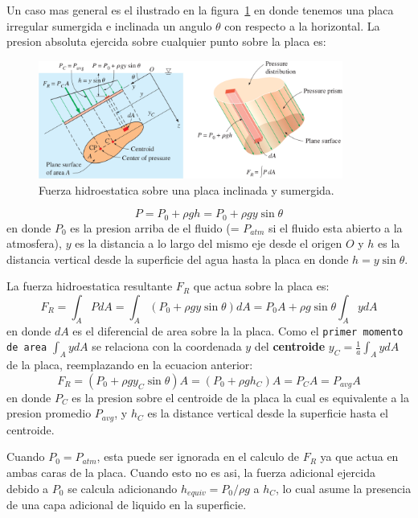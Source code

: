 \documentclass[10pt, oneside]{article}
\begin{document}
Un caso mas general es el ilustrado en la figura~\ref{hes2} en donde tenemos una placa irregular sumergida e inclinada un angulo $\theta$ con respecto a la horizontal. La presion absoluta ejercida sobre cualquier punto sobre la placa es:
\begin{figure}[h]
\centering
\includegraphics[width=10cm]{hes2}
\caption{Fuerza hidroestatica sobre una placa inclinada y sumergida.}
\label{hes2}
\end{figure}

$$
P=P_0 + \rho g h = P_0 + \rho g y \sin \theta
$$
en donde $P_0$ es la presion arriba de el fluido (= $P_{atm}$ si el fluido esta abierto a la atmosfera), $y$ es la distancia a lo largo del mismo eje desde el origen $O$ y $h$ es la distancia vertical desde la superficie del agua hasta la placa en donde $h=y \sin \theta$. 

La fuerza hidroestatica resultante $F_R$ que actua sobre la placa es:
$$
F_R = \int_A P dA = \int_A (P_0 + \rho g y \sin \theta) dA = P_0 A + \rho g \sin \theta \int_A y dA
$$
en donde $dA$ es el diferencial de area sobre la la placa. Como el \texttt{primer momento de area} $\int_A y dA$ se relaciona con la coordenada $y$ del \textbf{centroide} $y_C = \frac{1}{a} \int_A y dA$ de la placa, reemplazando en la ecuacion anterior:
\begin{equation}
F_R = (P_0 + \rho g y_C \sin \theta)A = (P_0 + \rho g h_C)A = P_C A = P_{avg} A
\label{fr}
\end{equation}
en donde $P_C$ es la presion sobre el centroide de la placa la cual es equivalente a la presion promedio $P_{avg}$, y $h_C$ es la distance vertical desde la superficie hasta el centroide.

Cuando $P_0 = P_{atm}$, esta puede ser ignorada en el calculo de $F_R$ ya que actua en ambas caras de la placa. Cuando esto no es asi, la fuerza adicional ejercida debido a $P_0$ se calcula adicionando $h_{equiv}=P_0 /\rho g$ a $h_C$, lo cual asume la presencia de una capa adicional de liquido en la superficie. 
\end{document}
